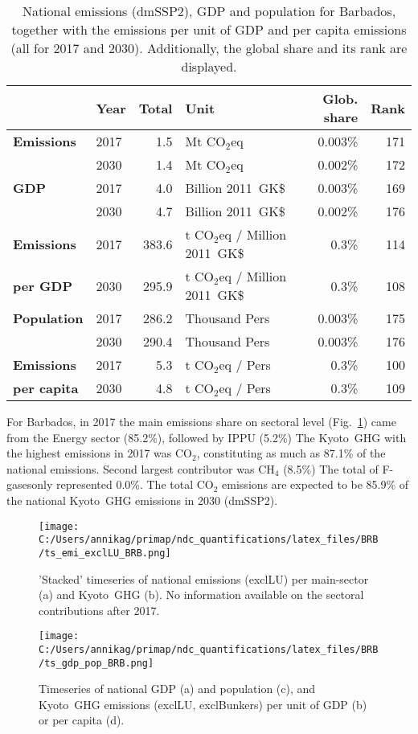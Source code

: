 \documentclass[12pt]{article}
\begin{document}
 \begin{table}[H]
 \centering
 \caption{National emissions (dmSSP2), GDP and population for Barbados, together with the emissions per unit of GDP and per capita emissions (all for 2017 and 2030). 
 Additionally, the global share and its rank are displayed.}
 \label{tab:overview}
 \begin{tabular}{l || l r l r r}
 \bfseries  & \bfseries Year & \bfseries Total & \bfseries Unit & \bfseries Glob. share & \bfseries Rank \tabularnewline \hline \hline
 \bfseries Emissions & 2017 & 1.5 & Mt CO$_2$eq & 0.003\% & 171 \tabularnewline 
 \bfseries  & 2030 & 1.4 & Mt CO$_2$eq & 0.002\% & 172 \tabularnewline \hline
 \bfseries GDP & 2017 & 4.0 & Billion 2011~GK\$ & 0.003\% & 169 \tabularnewline 
 \bfseries  & 2030 & 4.7 & Billion 2011~GK\$ & 0.002\% & 176 \tabularnewline \hline
 \bfseries Emissions & 2017 & 383.6 & t CO$_2$eq / Million 2011~GK\$ & 0.3\% & 114 \tabularnewline 
 \bfseries per GDP & 2030 & 295.9 & t CO$_2$eq / Million 2011~GK\$ & 0.3\% & 108 \tabularnewline \hline
 \bfseries Population & 2017 & 286.2 & Thousand Pers & 0.003\% & 175 \tabularnewline 
 \bfseries  & 2030 & 290.4 & Thousand Pers & 0.003\% & 176 \tabularnewline \hline
 \bfseries Emissions & 2017 & 5.3 & t CO$_2$eq /  Pers & 0.3\% & 100 \tabularnewline 
 \bfseries per capita & 2030 & 4.8 & t CO$_2$eq /  Pers & 0.3\% & 109 \tabularnewline 
 \end{tabular}
 \end{table}

 For Barbados, in 2017 the main emissions share on sectoral level (Fig.~\ref{fig:tsEmi}) came from the Energy sector (85.2\%), followed by IPPU (5.2\%)
 The Kyoto~GHG with the highest emissions in 2017 was CO$_2$, constituting as much as 87.1\% of the national emissions. 
 Second largest contributor was CH$_4$ (8.5\%)
 The total of F-gasesonly represented 0.0\%.
 The total CO$_2$ emissions are expected to be 85.9\% of the national Kyoto~GHG emissions in 2030 (dmSSP2).

 \begin{figure}[H]
 \centering
 \texttt{[image: C:/Users/annikag/primap/ndc\_quantifications/latex\_files/BRB/ts\_emi\_exclLU\_BRB.png]}
 \caption{'Stacked' timeseries of national emissions (exclLU) per main-sector (a) and Kyoto~GHG (b). 
 No information available on the sectoral contributions after 2017.}
 \label{fig:tsEmi}
 \end{figure}

 \begin{figure}[H]
 \centering
 \texttt{[image: C:/Users/annikag/primap/ndc\_quantifications/latex\_files/BRB/ts\_gdp\_pop\_BRB.png]}
 \caption{Timeseries of national GDP (a) and population (c), and Kyoto~GHG emissions (exclLU, exclBunkers) per unit of GDP (b) or per capita (d).}
 \label{fig:tsSocioEco}
 \end{figure}
\end{document}
